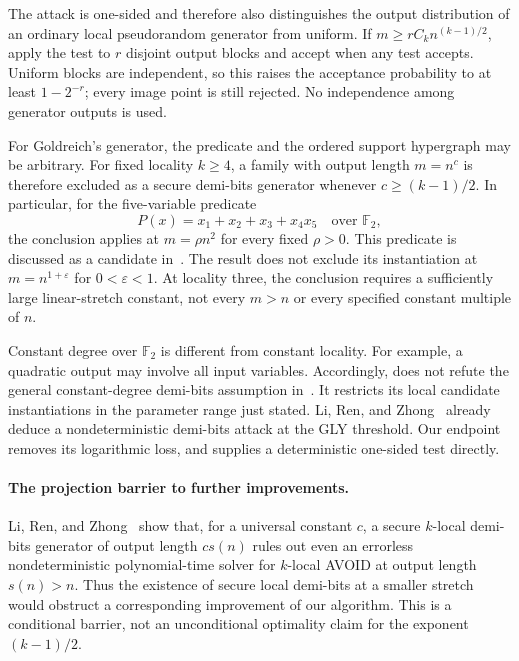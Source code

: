 \documentclass[letterpaper,11pt]{article}
\theoremstyle{definition}
\newcommand{\F}{\mathbb F}
\begin{document}
The attack is one-sided and therefore also distinguishes the output
distribution of an ordinary local pseudorandom generator from uniform.
If $m\ge rC_kn^{(k-1)/2}$, apply the test to $r$ disjoint output
blocks and accept when any test accepts. Uniform blocks are independent,
so this raises the acceptance probability to at least $1-2^{-r}$;
every image point is still rejected. No independence among generator
outputs is used.

For Goldreich's generator, the predicate and the ordered support
hypergraph may be arbitrary. For fixed locality $k\ge4$, a family
with output length $m=n^c$ is therefore excluded as a secure
demi-bits generator whenever $c\ge(k-1)/2$. In particular, for
the five-variable predicate
\[
 P(x)=x_1+x_2+x_3+x_4x_5\quad\text{over }\F_2,
\]
the conclusion applies at $m=\rho n^2$ for every fixed $\rho>0$.
This predicate is discussed as a candidate in~\cite[Appendix~B.3]{RWZ26}.
The result does not exclude its instantiation at $m=n^{1+\varepsilon}$
for $0<\varepsilon<1$. At locality three, the conclusion requires a
sufficiently large linear-stretch constant, not every $m>n$ or every
specified constant multiple of $n$.

Constant degree over $\F_2$ is different from constant locality.
For example, a quadratic output may involve all input variables.
Accordingly,  does not refute the general
constant-degree demi-bits assumption in~\cite[Assumption~2.3]{RWZ26}.
It restricts its local candidate instantiations in the parameter
range just stated. Li, Ren, and Zhong~\cite[Corollary~4.6]{LRZ26}
already deduce a nondeterministic demi-bits attack at the GLY
threshold. Our endpoint removes its logarithmic loss, and
 supplies a deterministic one-sided test directly.

\paragraph{The projection barrier to further improvements.}
Li, Ren, and Zhong~\cite[Corollary~4.5]{LRZ26} show that, for a
universal constant $c$, a secure $k$-local demi-bits generator of
output length $c s(n)$ rules out even an errorless nondeterministic
polynomial-time solver for $k$-local AVOID at output length $s(n)>n$.
Thus the existence of secure local demi-bits at a smaller stretch
would obstruct a corresponding improvement of our algorithm.
This is a conditional barrier, not an unconditional optimality
claim for the exponent $(k-1)/2$.
\end{document}
